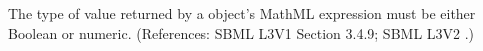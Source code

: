 The type of value returned by a \FunctionDefinition object's 
MathML expression must be either Boolean or numeric.  (References: SBML L3V1 Section 3.4.9; SBML
L3V2 .)
